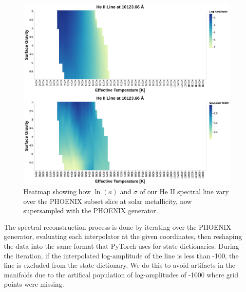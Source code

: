 \documentclass[twocolumn, linenumbers]{aastex631}
\begin{document}
\begin{figure}
    \centering
    \includegraphics[width=\textwidth]{figure6}
    \caption{Heatmap showing how $\ln(a)$ and $\sigma$ of our He II spectral line vary over the PHOENIX subset slice at solar metallicity, now supersampled with the PHOENIX generator.}
    \label{fig:figure6}
\end{figure}

The spectral reconstruction process is done by iterating over the PHOENIX generator, evaluating each interpolator at the given coordinates, then reshaping the data into the same format that PyTorch uses for state dictionaries.
During the iteration, if the interpolated log-amplitude of the line is less than -100, the line is excluded from the state dictionary.
We do this to avoid artifacts in the manifolds due to the artifical population of log-amplitudes of -1000 where grid points were missing.
\end{document}
